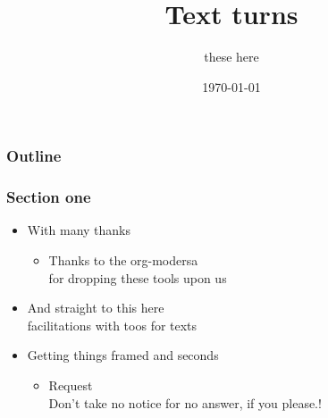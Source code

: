 \documentclass[presentation]{beamer}
\title{Text turns}
\author{these here}
\date{\today}
\begin{document}
\maketitle

\begin{frame}
\frametitle{Outline}
\setcounter{tocdepth}{2}
\tableofcontents
\end{frame}
\begin{frame}
\frametitle{Section one}
\label{sec-1}
\begin{itemize}

\item With many thanks
\label{sec-1-1}%
\begin{itemize}

\item Thanks to the org-modersa\\
\label{sec-1-1-1}%
for dropping these tools upon us
\end{itemize} %

\item And straight to this here\\
\label{sec-1-2}%
facilitations with toos for texts

\item Getting things framed and seconds
\label{sec-1-3}%
\begin{itemize}

\item Request\\
\label{sec-1-3-1}%
Don't take no notice for no answer, if you please.!
\end{itemize} %
\end{itemize} %
\end{frame}
\end{document}
